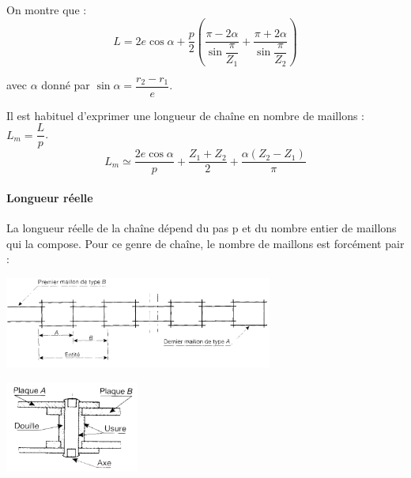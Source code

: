 \documentclass[11pt,oneside]{article}
\begin{document}
On montre que :  
$$L=2e\cos\alpha + \dfrac{p}{2} \left( \dfrac{\pi - 2\alpha}{\sin \dfrac{\pi }{Z_1}} + \dfrac{\pi + 2\alpha}{\sin \dfrac{\pi }{Z_2}}\right)$$


avec $\alpha$ donné par $\sin \alpha = \dfrac{r_2-r_1}{e}$.


Il est habituel d’exprimer une longueur de chaîne en nombre de maillons : $L_m = \dfrac{L}{p}$.
$$
L_m \simeq \dfrac{2e \cos \alpha}{p} +\dfrac{Z_1+Z_2}{2} +\dfrac{\alpha \left( Z_2-Z_1\right)}{\pi}
$$

\paragraph{Longueur réelle}
La longueur réelle de la chaîne dépend du pas p et du nombre entier de maillons qui la compose.
Pour ce genre de chaîne, le nombre de maillons est forcément pair :

\begin{minipage}[c]{.45\linewidth}
\begin{center}
\includegraphics[height=3cm]{png/fig_52}
\end{center}
\end{minipage} \hfill
\begin{minipage}[c]{.45\linewidth}
\begin{center}
\includegraphics[height=3cm]{png/fig_53}
\end{center}
\end{minipage} 
\end{document}

